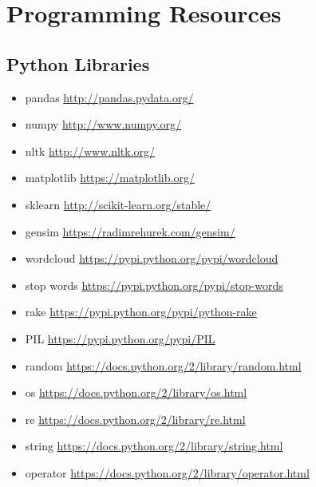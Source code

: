 \begin{singlespace}

\end{singlespace}

\newpage
\section{Programming Resources}
\subsection{Python Libraries}
\begin{itemize}
	\begin{itemize} \itemsep -10pt
	\item pandas \url{http://pandas.pydata.org/}
	\item numpy \url{http://www.numpy.org/}
	\item nltk \url{http://www.nltk.org/}
	\item matplotlib \url{https://matplotlib.org/}
	\item sklearn \url{http://scikit-learn.org/stable/}
	\item gensim \url{https://radimrehurek.com/gensim/}
	\item wordcloud \url{https://pypi.python.org/pypi/wordcloud}
	\item stop words \url{https://pypi.python.org/pypi/stop-words}
	\item rake \url{https://pypi.python.org/pypi/python-rake}
	\item PIL \url{https://pypi.python.org/pypi/PIL}
	\item random \url{https://docs.python.org/2/library/random.html}
	\item os \url{https://docs.python.org/2/library/os.html}
	\item re \url{https://docs.python.org/2/library/re.html}
	\item string \url{https://docs.python.org/2/library/string.html}
	\item operator \url{https://docs.python.org/2/library/operator.html}
	\end{itemize}
\end{itemize}

